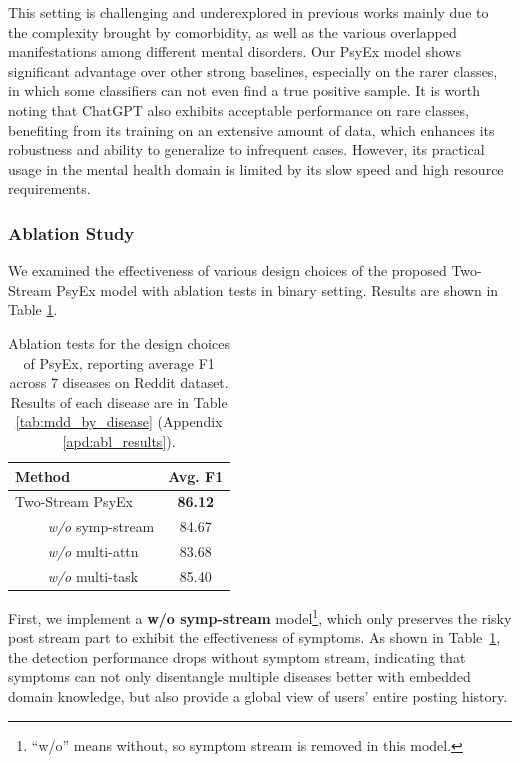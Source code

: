 This setting is challenging and underexplored in previous works mainly due to the complexity brought by comorbidity, as well as the various overlapped manifestations among different mental disorders. Our PsyEx model shows significant 
advantage over other strong baselines, especially on the rarer classes, in which some classifiers can not even find a true positive sample. 
It is worth noting that ChatGPT also exhibits acceptable performance on rare classes, benefiting from its training on an extensive amount of data, which enhances its robustness and ability to generalize to infrequent cases. However, its practical usage in the mental health domain is limited by its slow speed and high resource requirements.

\subsubsection{Ablation Study}
\label{sec:ablation}

We examined the effectiveness of various design choices of the proposed Two-Stream PsyEx model with ablation tests in binary setting. Results are shown in Table \ref{tab:ablation}.
\begin{table}[th]
    \small
    \centering
    \begin{tabular}{l|c}
        \hline
        Method & Avg. F1             \\
        \hline
        Two-Stream PsyEx &  \textbf{86.12}      \\
        ~~~~ \textit{w/o} symp-stream & 84.67 \\
        ~~~~ \textit{w/o} multi-attn & 83.68       \\
        ~~~~ \textit{w/o} multi-task & 85.40     \\
        \hline
    \end{tabular}
    \caption{Ablation tests for the design choices of PsyEx, reporting average F1 across 7 diseases on Reddit dataset. Results of each disease are in Table \ref{tab:mdd_by_disease} (Appendix \ref{apd:abl_results}).}
    \label{tab:ablation}
\end{table}

First, we implement a \textbf{w/o symp-stream} model\footnote{``w/o'' means without, so symptom stream is removed in this model.}, which only preserves the risky post stream part to exhibit the effectiveness of symptoms.  As shown in Table~\ref{tab:ablation}, the detection performance drops without symptom stream, indicating that symptoms can not only disentangle multiple diseases better with embedded domain knowledge, but also provide a global view of users' entire posting history.

